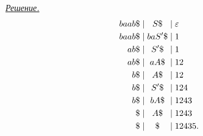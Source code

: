 \documentclass[10pt]{article}
\newcounter{pr} \setcounter{pr}{0}
\newenvironment{sol}
  {\par
   {\itshape \underline{Решение.}}}
  {}
\newcommand{\eps}{\varepsilon}
\begin{document}
\begin{pr}
\begin{sol}
      \begin{equation*}
        \begin{aligned}
          baab \$ \mid & \\
          baab \$ \mid & \\
          ab \$ \mid & \\
          ab \$ \mid & \\
          b \$ \mid & \\
          b \$ \mid & \\
          b \$ \mid & \\
          \$ \mid & \\
          \$ \mid &
        \end{aligned}
        \hspace{1mm}
        \begin{gathered}
          S \$ \\
          baS' \$ \\
          S' \$ \\
          aA \$ \\
          A \$ \\
          S' \$ \\
          bA \$ \\
          A \$ \\
          \$
        \end{gathered}
        \begin{aligned}
          & \mid \eps \\
          & \mid 1 \\
          & \mid 1 \\
          & \mid 12 \\
          & \mid 12 \\
          & \mid 124 \\
          & \mid 1243 \\
          & \mid 1243 \\
          & \mid 12435.
        \end{aligned}
      \end{equation*}
    \end{sol}
  \end{pr}
\end{document}
